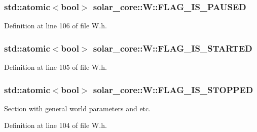 \subsubsection[{F\+L\+A\+G\+\_\+\+I\+S\+\_\+\+P\+A\+U\+S\+E\+D}]{\setlength{\rightskip}{0pt plus 5cm}std\+::atomic$<$bool$>$ solar\+\_\+core\+::\+W\+::\+F\+L\+A\+G\+\_\+\+I\+S\+\_\+\+P\+A\+U\+S\+E\+D}\label{classsolar__core_1_1_w_a1c0ebdba727a7a5cbf322072ab5c9184}


Definition at line 106 of file W.\+h.

\hypertarget{classsolar__core_1_1_w_a8456f88d45f2e8bf67eccd7f0c8d08fa}{}
\subsubsection[{F\+L\+A\+G\+\_\+\+I\+S\+\_\+\+S\+T\+A\+R\+T\+E\+D}]{\setlength{\rightskip}{0pt plus 5cm}std\+::atomic$<$bool$>$ solar\+\_\+core\+::\+W\+::\+F\+L\+A\+G\+\_\+\+I\+S\+\_\+\+S\+T\+A\+R\+T\+E\+D}\label{classsolar__core_1_1_w_a8456f88d45f2e8bf67eccd7f0c8d08fa}


Definition at line 105 of file W.\+h.

\hypertarget{classsolar__core_1_1_w_a9bb998c65a7427961de179f41e25daea}{}
\subsubsection[{F\+L\+A\+G\+\_\+\+I\+S\+\_\+\+S\+T\+O\+P\+P\+E\+D}]{\setlength{\rightskip}{0pt plus 5cm}std\+::atomic$<$bool$>$ solar\+\_\+core\+::\+W\+::\+F\+L\+A\+G\+\_\+\+I\+S\+\_\+\+S\+T\+O\+P\+P\+E\+D}\label{classsolar__core_1_1_w_a9bb998c65a7427961de179f41e25daea}
Section with general world parameters and etc. 

Definition at line 104 of file W.\+h.

\hypertarget{classsolar__core_1_1_w_a7aa8b882244539e098e45207045d7d88}{}
